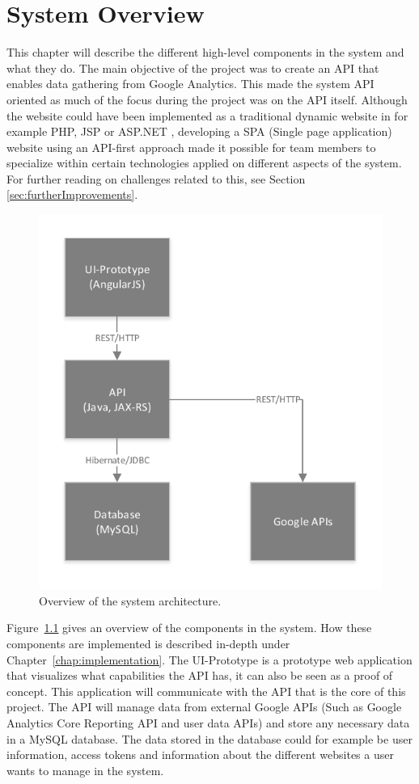 \chapter{System Overview}
\label{chap:architecture}


This chapter will describe the different high-level components in the system and what they do. The main objective of the project was to create an API that enables data gathering from Google Analytics. This made the system API oriented as much of the focus during the project was on the API itself. Although the website could have been implemented as a traditional dynamic website in for example PHP, JSP or ASP.NET \cite{Build81:online}, developing a SPA (Single page application) website using an API-first approach made it possible for team members to specialize within certain technologies applied on different aspects of the system. For further reading on challenges related to this, see Section \ref{sec:furtherImprovements}.

\begin{figure}[h]
  \centering
  \includegraphics[width=.5\textwidth]{figures/System_overview.pdf}
  \caption[System overview.]{Overview of the system architecture.}
  \label{fig:systemOverview}
\end{figure}

Figure~\ref{fig:systemOverview} gives an overview of the components in the system. How these components are implemented is described in-depth under Chapter~\ref{chap:implementation}. The UI-Prototype is a prototype web application that visualizes what capabilities the API has, it can also be seen as a proof of concept. This application will communicate with the API that is the core of this project. The API will manage data from external Google APIs (Such as Google Analytics Core Reporting API \cite{GoogleAnalyticsCoreAPI} and user data APIs) and store any necessary data in a MySQL database. The data stored in the database could for example be user information, access tokens and information about the different websites a user wants to manage in the system. 